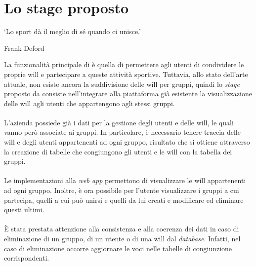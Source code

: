 \section{Lo stage proposto}
\epigraph{\label{eph: sport}\enquote*{Lo sport dà il meglio di sé quando ci
            unisce.}}{Frank Deford}
\noindent La funzionalità principale di \productName è quella di permettere
agli utenti di condividere le proprie
\gls{will} e partecipare a queste attività sportive. Tuttavia, allo stato
dell'arte attuale, non esiste ancora la suddivisione
delle \gls{will}
per gruppi, quindi lo \textit{stage} proposto da \myCompany consiste
nell'integrare
alla piattaforma già esistente
la visualizzazione delle \gls{will} agli utenti che appartengono agli stessi
gruppi.\\ \\
L'azienda possiede già i dati per la gestione degli utenti e delle
\gls{will}, le quali vanno però associate ai gruppi. In particolare, è
necessario
tenere
traccia delle \gls{will} e degli utenti appartenenti ad ogni gruppo, risultato
che si ottiene attraverso
la creazione di tabelle che congiungono gli
utenti e le \gls{will} con la tabella dei gruppi.\\ \\
Le implementazioni alla \textit{web app} permettono di visualizzare le
\gls{will} appartenenti
ad ogni gruppo. Inoltre, è ora possibile per l'utente visualizzare i gruppi a cui partecipa, quelli a cui può unirsi e quelli da lui creati e
modificare ed eliminare questi ultimi. \\ \\
È stata prestata attenzione alla consistenza e alla coerenza dei dati in caso
di eliminazione di un gruppo, di un utente o di una \gls{will} dal
\textit{database}.
Infatti, nel caso di eliminazione occorre
aggiornare le voci nelle tabelle di congiunzione corrispondenti.

